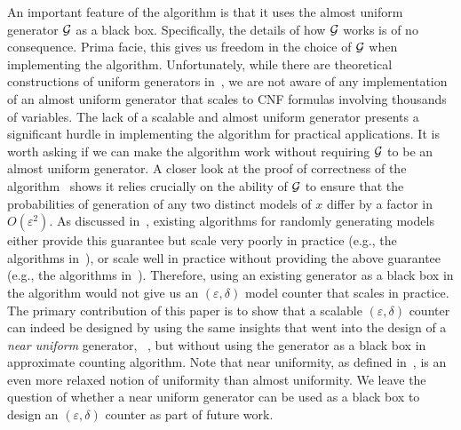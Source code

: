 An important feature of the {\JVV} algorithm is that it uses the
almost uniform generator $\mathcal{G}$ as a black box.  Specifically, the
details of how $\mathcal{G}$ works is of no consequence.  Prima facie, this
gives us freedom in the choice of $\mathcal{G}$ when implementing the
{\JVV} algorithm.  Unfortunately, while there are theoretical 
constructions of uniform 
generators in~\cite{Bellare98uniformgeneration},
we are not aware of any implementation of an almost uniform generator 
that scales to CNF formulas involving thousands of variables.
%
%
%
%
%
%
The lack of a scalable and almost uniform generator presents
a significant hurdle in implementing the {\JVV} algorithm for
practical applications.
It is worth asking if we can make the {\JVV} algorithm work without
requiring $\mathcal{G}$ to be an almost uniform generator.  A closer look
at the proof of correctness of the {\JVV} algorithm~\cite{Jerr} shows
it relies crucially on the ability of $\mathcal{G}$ to ensure that the
probabilities of generation of any two distinct models of $x$ differ
by a factor in $O(\varepsilon^2)$.  As discussed in~\cite{SKV13},
existing algorithms for randomly generating models either provide this
guarantee but scale very poorly in practice (e.g., the algorithms
in~\cite{Bellare98uniformgeneration,Yuan2004}), or scale well in
practice without providing the above guarantee (e.g., the algorithms
in~\cite{SKV13,Gomes-Sampling,KitKue2007}).  Therefore, using an
existing generator as a black box in the {\JVV} algorithm would not
give us an $(\varepsilon, \delta)$ model counter that scales in
practice. %
%
%
%
The primary contribution of this paper is to show that a scalable
$(\varepsilon, \delta)$ counter can indeed be designed by using the
same insights that went into the design of a \emph{near uniform}
generator, {\UniformWitness}~\cite{SKV13}, but without using the
generator as a black box in  approximate counting
algorithm.  Note that near uniformity, as defined in~\cite{SKV13}, is
an even more relaxed notion of uniformity than almost uniformity.  We
leave the question of whether a near uniform generator can be used as
a black box to design an $(\varepsilon, \delta)$ counter as part of
future work.

